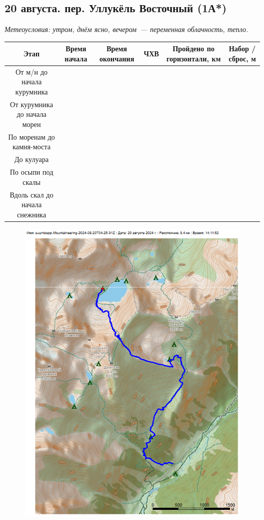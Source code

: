 \subsection{20 августа. пер. Уллукёль Восточный (1А*)}
\textit{Метеоусловия: утром, днём ясно, вечером~--- переменная облачность, тепло.}

\begin{table}[h!]
	\begin{tabular}{|c|c|c|c|c|c|} 
		\hline 
		Этап & Время начала & Время окончания & ЧХВ & Пройдено по горизонтали, км & Набор / сброс, м \\ 	
		\hline 
		От м/н до начала курумника & & & & \\ 
		От курумника до начала морен &&&& \\ 
		По моренам до камня-моста &&&& \\ 
		До кулуара &&&& \\
		По осыпи под скалы &&&&\\ 
		Вдоль скал до начала снежника &&&&
		\end{tabular}
	\end{table}

\begin{figure}[h!]
	\centering
	\includegraphics[angle=0, width=0.7\linewidth]{../pics/mini_maps/20}
	\label{fig:mini_20}
\end{figure}

